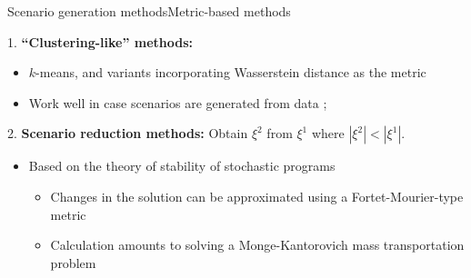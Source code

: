 %
%			
%	

\begin{frame}{Scenario generation methods}{Metric-based methods}

			
		{\color{blue}1.} {\bf ``Clustering-like'' methods:}
		\vspace{-6pt}
		\begin{itemize}
			\item $k$-means, and variants incorporating \alert{Wasserstein distance} as the metric {\small \cite{condeixa2020wasserstein}}
			\item Work well in case scenarios are generated from \alert{data} {\small\cite{kaut2021scenario}};
		\end{itemize}
		\pause
		
		{\color{blue}2.} {\bf Scenario reduction methods:} Obtain $\xi^2$ from $\xi^1$ where $|\xi^2| < |\xi^1|$.
		\vspace{-6pt}
		\begin{itemize}
			\item Based on the theory of stability of stochastic programs {\small \cite{romisch2003stability}}
			\begin{itemize}
				\item Changes in the solution can be approximated using a Fortet-Mourier-type metric
				\item Calculation amounts to solving a Monge-Kantorovich mass transportation problem
			\end{itemize}	
		\end{itemize}

\end{frame}

